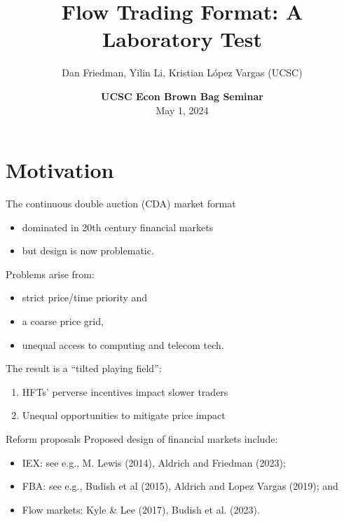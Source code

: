 \documentclass[10pt]{beamer}
\title[FlowTrading]{Flow Trading Format: A Laboratory Test}
\author[DF-YL-KL]{Dan Friedman, Yilin Li, Kristian L\'opez Vargas (UCSC)}
\institute[UCSC]{}
\date[4/27/2024]{\vspace{1cm} \textbf{UCSC Econ Brown Bag Seminar} \\
May 1, 2024}
\begin{document}
\maketitle


\section{Motivation}
\begin{frame}{
The continuous double auction (CDA) market format}
\begin{itemize}
\item dominated in 20th century financial markets 
\item but design is now problematic.  %
\end{itemize}
Problems arise from:
\begin{itemize}
\item strict price/time priority and 
\item a coarse price grid, 
\item unequal access to computing and telecom tech.

\end{itemize} %
The result is a ``tilted playing field'': 
\begin{enumerate}
\item HFTs' perverse incentives impact slower traders
\item Unequal opportunities to mitigate price impact
   \end{enumerate}
\end{frame}

\begin{frame}{Reform proposals}
Proposed design of financial markets include:
    \begin{itemize}
\item IEX: see e.g., M. Lewis (2014), Aldrich and Friedman (2023); %
\item FBA: see e.g., Budish et al (2015), Aldrich and Lopez Vargas (2019); and %
\item Flow markets:  Kyle \& Lee (2017), Budish et al. (2023).
\end{itemize}
\end{frame}
\end{document}

